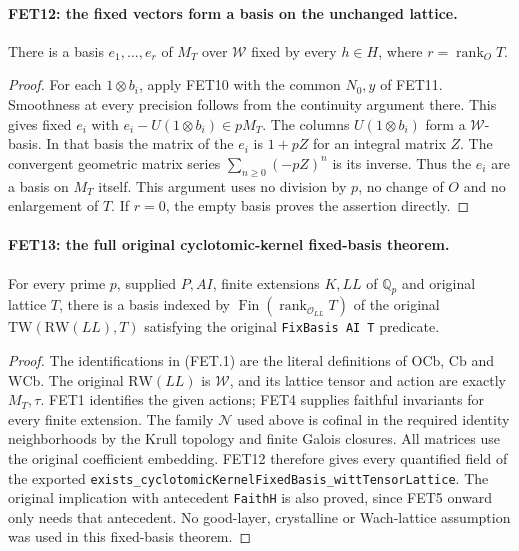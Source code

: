 \documentclass[11pt,a4paper]{article}
\numberwithin{equation}{section}
\theoremstyle{remark}\newtheorem{remark}[theorem]{Remark}
\begin{document}
\paragraph{FET12: the fixed vectors form a basis on the unchanged lattice.}
\label{claim:FET12}
There is a basis $e_1,\ldots,e_r$ of $M_T$ over $\mathcal W$
fixed by every $h\in H$, where $r=\operatorname{rank}_O T$.

\begin{proof}
For each $1\otimes b_i$, apply FET10 with the common $N_0,y$
of FET11. Smoothness at every precision follows from the
continuity argument there. This gives fixed $e_i$ with
$e_i-U(1\otimes b_i)\in pM_T$.
The columns $U(1\otimes b_i)$ form a $\mathcal W$-basis.
In that basis the matrix of the $e_i$ is $1+pZ$ for an
integral matrix $Z$. The convergent geometric matrix series
$\sum_{n\geq0}(-pZ)^n$ is its inverse.
Thus the $e_i$ are a basis on $M_T$ itself. This argument
uses no division by $p$, no change of $O$ and no enlargement
of $T$. If $r=0$, the empty basis proves the assertion directly.
\end{proof}

\paragraph{FET13: the full original cyclotomic-kernel fixed-basis theorem.}
\label{claim:FET13}
For every prime $p$, supplied $P,AI$, finite extensions $K,LL$ of $\mathbb Q_p$ and
original lattice $T$, there is a basis indexed by
$\operatorname{Fin}(\operatorname{rank}_{\mathcal O_{LL}}T)$
of the original $\mathrm{TW}(\mathrm{RW}(LL),T)$ satisfying
the original \texttt{Fix\allowbreak Basis AI T} predicate.

\begin{proof}
The identifications in (FET.1) are the literal definitions of
$\mathrm{OCb}$, $\mathrm{Cb}$ and $\mathrm{WCb}$. The original
$\mathrm{RW}(LL)$ is $\mathcal W$, and its lattice tensor and
action are exactly $M_T,\tau$. FET1 identifies the given actions;
FET4 supplies faithful invariants for every finite extension.
The family $\mathcal N$ used above is cofinal in the required
identity neighborhoods by the Krull topology and finite Galois
closures. All matrices use the original coefficient embedding.
FET12 therefore gives every quantified field of the exported
\texttt{exists\_\allowbreak cyclotomic\allowbreak Kernel\allowbreak Fixed\allowbreak Basis\_\allowbreak witt\allowbreak Tensor\allowbreak Lattice}.
The original implication with antecedent \texttt{Faith\allowbreak H} is
also proved, since FET5 onward only needs that antecedent.
No good-layer, crystalline or Wach-lattice assumption was used
in this fixed-basis theorem.
\end{proof}
\end{document}
